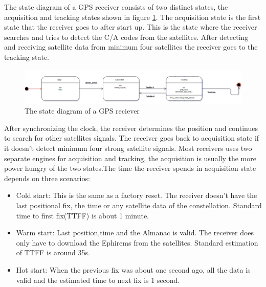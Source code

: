   The state diagram of a GPS receiver consists of two distinct states, the acquisition and tracking states shown in figure \ref{fig:GPS reciever}. The acquisition state is the first state that the receiver goes to after start up. This is the state where the receiver searches and tries to detect the C/A codes from the satellites. After detecting and receiving satellite data from minimum four satellites the receiver goes to the tracking state.
 \begin{figure}[H]
\centering
\includegraphics[width=16 cm]{Project_Report/Images/gps_basics.PNG}
\caption{The state diagram of a GPS reciever}
\label{fig:GPS reciever}
\end{figure}

After synchronizing the clock, the receiver determines the position and continues to search for other satellites signals. The receiver goes back to acquisition state if it doesn't detect minimum four strong satellite signals.
Most receivers uses two separate engines for acquisition and tracking, the acquisition is usually the more power hungry of the two states.The time the receiver spends in acquisition state depends on three scenarios:
\begin{itemize}
\item Cold start: This is the same as a factory reset. The receiver doesn't have the last positional fix, the time or any satellite data of the constellation. Standard time to first fix(TTFF) is about 1 minute.
\item Warm start: Last position,time and the Almanac is valid. The receiver does only have to download the Ephirems from the satellites. Standard estimation of TTFF is around 35s.
\item Hot start: When the previous fix was about one second ago, all the data is valid and the estimated time to next fix is 1 second. 

\end{itemize}


\newpage